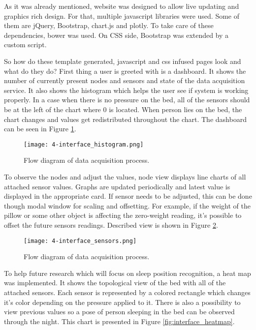 As it was already mentioned, website was designed to allow live updating and graphics rich design. For that, multiple javascript libraries were used. Some of them are jQuery, Bootstrap, chart.js and plotly. To take care of these dependencies, bower was used. On \ac{CSS} side, Bootstrap was extended by a custom script.

So how do these template generated, javascript and css infused pages look and what do they do? First thing a user is greeted with is a dashboard. It shows the number of currently present nodes and sensors and state of the data acquisition service. It also shows the histogram which helps the user see if system is working properly. In a case when there is no pressure on the bed, all of the sensors should be at the left of the chart where 0 is located. When person lies on the bed, the chart changes and values get redistributed throughout the chart. The dashboard can be seen in Figure \ref{fig:interface_histogram}.

\begin{figure}[h]
  \begin{center}
    \texttt{[image: 4-interface\_histogram.png]}
  \end{center}
  \caption{Flow diagram of data acquisition process.}
  \label{fig:interface_histogram}
\end{figure}

To observe the nodes and adjust the values, node view displays line charts of all attached sensor values. Graphs are updated periodically and latest value is displayed in the appropriate card. If sensor needs to be adjusted, this can be done though modal window for scaling and offsetting. For example, if the weight of the pillow or some other object is affecting the zero-weight reading, it's possible to offset the future sensors readings. Described view is shown in Figure \ref{fig:interface_sensors}.

\begin{figure}[h]
  \begin{center}
    \texttt{[image: 4-interface\_sensors.png]}
  \end{center}
  \caption{Flow diagram of data acquisition process.}
  \label{fig:interface_sensors}
\end{figure}

To help future research which will focus on sleep position recognition, a heat map was implemented. It shows the topological view of the bed with all of the attached sensors. Each sensor is represented by a colored rectangle which changes it's color depending on the pressure applied to it. There is also a possibility to view previous values so a pose of person sleeping in the bed can be observed through the night. This chart is presented in Figure \ref{fig:interface_heatmap}.

